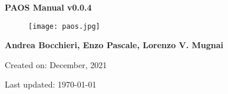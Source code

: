 

\begin{titlepage}

    \centering

    \vspace*{30mm} %
    \textbf{\Huge {PAOS Manual v0.0.4}}

    \vspace{20mm}
    \begin{figure}[!h]
        \centering
        \texttt{[image: paos.jpg]}
        \label{fig:paos_logo}
    \end{figure}

    \vspace{25mm}
    \Large \textbf{{Andrea Bocchieri, Enzo Pascale, Lorenzo V. Mugnai}}

    \vspace*{8mm}
    \small Created on: December, 2021

    \vspace{2mm}
    \small Last updated: \MonthYearFormat\today


\end{titlepage}

\clearpage
{}
\tableofcontents
\listoffigures
\listoftables
\clearpage
{}
